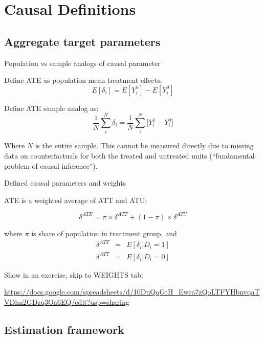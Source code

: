 \documentclass{beamer}
\begin{document}
\section{Causal Definitions}

\subsection{Aggregate target parameters}

\begin{frame}{Population vs sample analogs of causal parameter}

Define ATE as population mean treatment effects: $$E[\delta_i] = E[Y_i^1] - E[Y_i^0]$$

Define ATE sample analog as: $$\frac{1}{N} \sum_i^N \delta_i =  \frac{1}{N} \sum_i^N  \bigg [ Y_i^1 - Y_i^0 \bigg ]$$

Where $N$ is the entire sample.  This cannot be measured directly due to missing data on counterfactuals for both the treated and untreated units (``fundamental problem of causal inference'').


\end{frame}

\begin{frame}{Defined causal parameters and weights}

ATE is a weighted average of ATT and ATU:

$${\delta}^{ATE} = \pi \times  {\delta}^{ATT} + (1-\pi) \times {\delta}^{ATU}$$


where $\pi$ is share of population in treatment group, and
\begin{eqnarray*}
{\delta}^{ATT} &=& E[\delta_i | D_i=1] \\
{\delta}^{ATT} &=& E[\delta_i | D_i=0] 
\end{eqnarray*}

\bigskip

Show in an exercise, skip to WEIGHTS tab:

\url{https://docs.google.com/spreadsheets/d/10DuQqGtH_Ewea7zQoLTFYHbnvqaTVDhn2GDzq3Oa6EQ/edit?usp=sharing}

\end{frame}

\subsection{Estimation framework}
\end{document}
